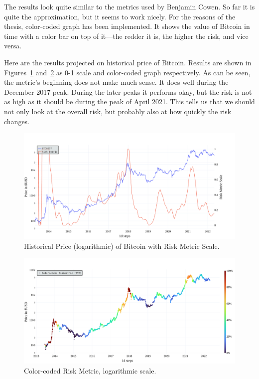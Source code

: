 The results look quite similar to the metrics used by Benjamin Cowen. So far it is quite the approximation, but it seems to work nicely. For the reasons of the thesis, color-coded graph has been implemented. It shows the value of Bitcoin in time with a color bar on top of it---the redder it is, the higher the risk, and vice versa.

Here are the results projected on historical price of Bitcoin. Results are shown in Figures~\ref{figure-50week-scale} and~\ref{figure-50week-colorcoded} as 0-1 scale and color-coded graph respectively. As can be seen, the metric's beginning does not make much sense. It does well during the December 2017 peak. During the later peaks it performs okay, but the risk is not as high as it should be during the peak of April 2021. This tells us that we should not only look at the overall risk, but probably also at how quickly the risk changes.

\begin{figure}[!t]
    \centering
    \includegraphics[width=\columnwidth]{figures/50week-scale.pdf}
    \caption{Historical Price (logarithmic) of Bitcoin with Risk Metric Scale.}
    \label{figure-50week-scale}
\end{figure}

\begin{figure}[!t]
    \centering
    \includegraphics[width=\columnwidth]{figures/50week-colorcoded.pdf}
    \caption{Color-coded Risk Metric, logarithmic scale.}
    \label{figure-50week-colorcoded}
\end{figure}

